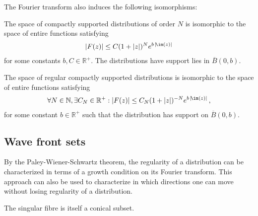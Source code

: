     The Fourier transform also induces the following isomorphisms:
    \begin{theorem}
        The space of compactly supported distributions of order $N$ is isomorphic to the space of entire functions satisfying
        \begin{gather}
            |F(z)|\leq C(1+|z|)^Ne^{b\,|\!\im(z)|}
        \end{gather}
        for some constants $b,C\in\mathbb{R}^+$. The distributions have support lies in $\overline{B}(0,b)$.

        The space of regular compactly supported distributions is isomorphic to the space of entire functions satisfying
        \begin{gather}
            \forall N\in\mathbb{N},\exists C_N\in\mathbb{R}^+:|F(z)|\leq C_N(1+|z|)^{-N}e^{b\,|\!\im(z)|}\,,
        \end{gather}
        for some constant $b\in\mathbb{R}^+$ such that the distribution has support on $\overline{B}(0,b)$.
    \end{theorem}

\subsection{Wave front sets}

    By the Paley-Wiener-Schwartz theorem, the regularity of a distribution can be characterized in terms of a growth condition on its Fourier transform. This approach can also be used to characterize in which directions one can move without losing regularity of a distribution.

    \begin{property}
        The singular fibre is itself a conical subset.
    \end{property}

